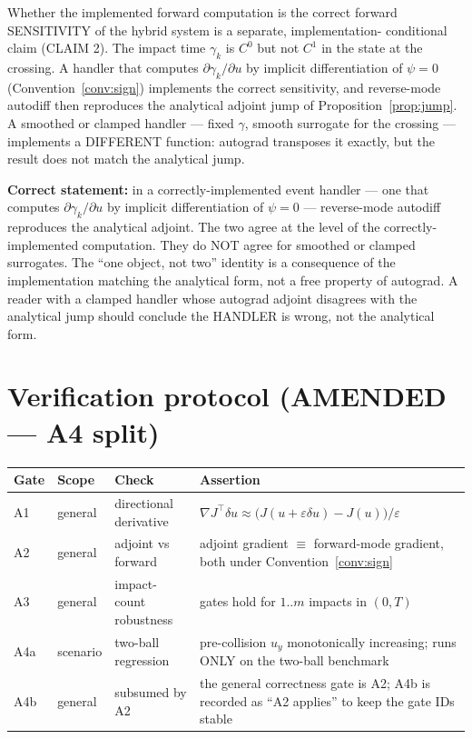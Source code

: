 \documentclass[11pt]{article}
\begin{document}
Whether the implemented forward computation is the correct forward
SENSITIVITY of the hybrid system is a separate, implementation-
conditional claim (CLAIM 2). The impact time $\gamma_k$ is
$C^0$ but not $C^1$ in the state at the crossing. A handler that
computes $\partial\gamma_k/\partial u$ by implicit differentiation
of $\psi = 0$ (Convention~\ref{conv:sign}) implements the correct
sensitivity, and reverse-mode autodiff then reproduces the
analytical adjoint jump of Proposition~\ref{prop:jump}. A smoothed
or clamped handler — fixed $\gamma$, smooth surrogate for the
crossing — implements a DIFFERENT function: autograd transposes it
exactly, but the result does not match the analytical jump.

\textbf{Correct statement:} in a correctly-implemented event
handler — one that computes $\partial\gamma_k/\partial u$ by
implicit differentiation of $\psi=0$ — reverse-mode autodiff
reproduces the analytical adjoint. The two agree at the level of
the correctly-implemented computation. They do NOT agree for
smoothed or clamped surrogates. The ``one object, not two''
identity is a consequence of the implementation matching the
analytical form, not a free property of autograd. A reader with a
clamped handler whose autograd adjoint disagrees with the
analytical jump should conclude the HANDLER is wrong, not the
analytical form.

\section{Verification protocol (AMENDED — A4 split)}
\begin{center}
\begin{tabular}{@{}llll@{}}
\toprule
Gate & Scope & Check & Assertion \\
\midrule
A1 & general & directional derivative &
  $\nabla J^\top \delta u \approx
  \bigl(J(u+\varepsilon\delta u)-J(u)\bigr)/\varepsilon$ \\
A2 & general & adjoint vs forward &
  adjoint gradient $\equiv$ forward-mode gradient,
  both under Convention~\ref{conv:sign} \\
A3 & general & impact-count robustness &
  gates hold for $1..m$ impacts in $(0,T)$ \\
A4a & scenario & two-ball regression &
  pre-collision $u_y$ monotonically increasing; runs ONLY on
  the two-ball benchmark \\
A4b & general & subsumed by A2 &
  the general correctness gate is A2; A4b is recorded as
  ``A2 applies'' to keep the gate IDs stable \\
\bottomrule
\end{tabular}
\end{center}
\end{document}
